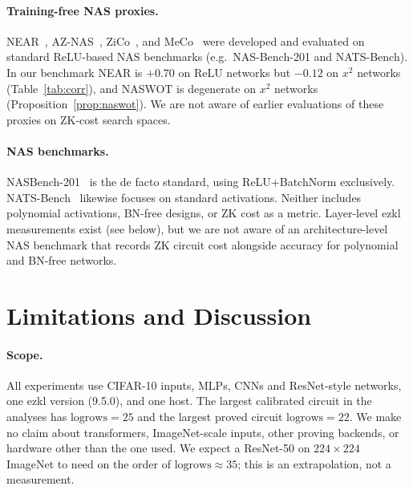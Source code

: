 \documentclass[10pt]{article}
\newcommand{\logrows}{\mathrm{logrows}}
\begin{document}
\paragraph{Training-free NAS proxies.}
NEAR~\citep{husistein2025near}, AZ-NAS~\citep{lee2024aznas},
ZiCo~\citep{li2023zico}, and MeCo~\citep{jiang2023meco} were developed and
evaluated on standard ReLU-based NAS benchmarks (e.g.\ NAS-Bench-201 and NATS-Bench).
In our benchmark NEAR is $+0.70$ on ReLU networks but $-0.12$ on $x^2$ networks (Table~\ref{tab:corr}), and NASWOT is degenerate on $x^2$ networks (Proposition~\ref{prop:naswot}).
We are not aware of earlier evaluations of these proxies on ZK-cost search spaces.

\paragraph{NAS benchmarks.}
NASBench-201~\citep{dong2020nasbench201} is the de facto standard, using
ReLU+BatchNorm exclusively.  NATS-Bench~\citep{dong2021natsbench} likewise
focuses on standard activations.  Neither includes polynomial activations,
BN-free designs, or ZK cost as a metric.  Layer-level ezkl measurements exist (see below), but we
are not aware of an architecture-level NAS benchmark that records ZK circuit cost alongside accuracy
for polynomial and BN-free networks.


\section{Limitations and Discussion}
\label{sec:limitations}

\paragraph{Scope.}
All experiments use CIFAR-10 inputs, MLPs, CNNs and ResNet-style networks, one ezkl version (9.5.0), and one host.  The largest calibrated circuit in the analyses has $\logrows{=}25$ and the largest proved circuit $\logrows{=}22$.  We make no
claim about transformers, ImageNet-scale inputs, other proving backends, or hardware other than the one used.  We expect a ResNet-50 on $224{\times}224$ ImageNet to need on the order of $\logrows{\approx}35$; this is an
extrapolation, not a measurement.
\end{document}
